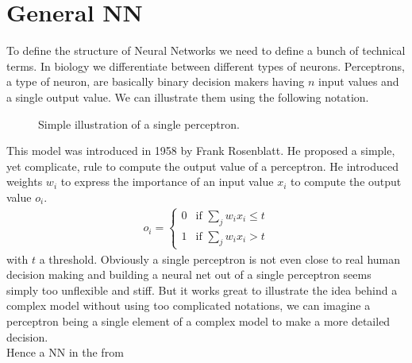 \documentclass[10pt]{book}
\begin{document}
    \section{General NN}
    To define the structure of Neural Networks we need to define a bunch of
    technical terms. In biology we differentiate between different types of neurons.
    Perceptrons, a type of neuron, are basically binary decision makers having \(n\) input values and a single output value.
    We can illustrate them using the following notation.
    \begin{figure}[h]
        \begin{center}
        \end{center}
        \caption{Simple illustration of a single perceptron.\label{fig:Perceptron}}
    \end{figure}
    This model was introduced in 1958 by Frank Rosenblatt. He proposed a simple, yet complicate,
    rule to compute the output value of a perceptron. He introduced weights \(w_i\) to express the importance
    of an input value \(x_i\) to compute the output value \(o_i\).
    \begin{align}
        o_i =
        \left\{
            \begin{matrix}
                0 & \text{if } \sum_j w_ix_i \leq t\\
                1 & \text{if } \sum_j w_ix_i > t
            \end{matrix}
        \right.
        \label{eq:perceptron}
    \end{align}
    with \(t\) a threshold.
    Obviously a single perceptron is not even close to real human decision making and building
    a neural net out of a single perceptron seems simply too unflexible and stiff.
    But it works great to illustrate the idea behind a complex model without using too complicated notations,
    we can imagine a perceptron being a single element of a complex model to make a more detailed decision.\\
    Hence a NN in the from\\
\end{document}
